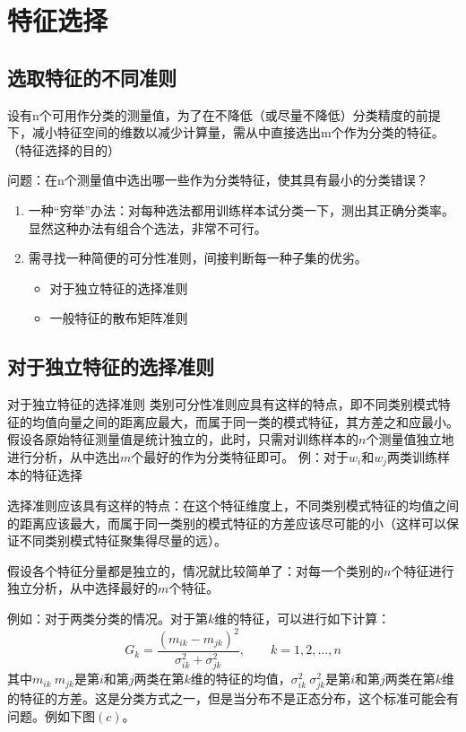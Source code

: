 \documentclass[12pt, letterpaper]{article}
\begin{document}
\section{特征选择}



\subsection{选取特征的不同准则}
设有n个可用作分类的测量值，为了在不降低（或尽量不降低）分类精度的前提下，减小特征空间的维数以减少计算量，需从中直接选出m个作为分类的特征。（特征选择的目的）

问题：在n个测量值中选出哪一些作为分类特征，使其具有最小的分类错误？
\begin{enumerate}
\item 一种“穷举”办法：对每种选法都用训练样本试分类一下，测出其正确分类率。显然这种办法有组合个选法，非常不可行。
\item 需寻找一种简便的可分性准则，间接判断每一种子集的优劣。
\begin{itemize}
\item 对于独立特征的选择准则
\item 一般特征的散布矩阵准则
\end{itemize}
\end{enumerate}



\subsection{对于独立特征的选择准则}
对于独立特征的选择准则
类别可分性准则应具有这样的特点，即不同类别模式特征的均值向量之间的距离应最大，而属于同一类的模式特征，其方差之和应最小。
假设各原始特征测量值是统计独立的，此时，只需对训练样本的$n$个测量值独立地进行分析，从中选出$m$个最好的作为分类特征即可。
例：对于$w_i$和$w_j$两类训练样本的特征选择

选择准则应该具有这样的特点：在这个特征维度上，不同类别模式特征的均值之间的距离应该最大，而属于同一类别的模式特征的方差应该尽可能的小（这样可以保证不同类别模式特征聚集得尽量的远）。

假设各个特征分量都是独立的，情况就比较简单了：对每一个类别的$n$个特征进行独立分析，从中选择最好的$m$个特征。

例如：对于两类分类的情况。对于第$k$维的特征，可以进行如下计算：
\begin{equation}
G_k=\frac{(m_{ik}-m_{jk})^2}{\sigma_{ik}^2+\sigma_{jk}^2},\qquad k=1,2,\ldots,n
\end{equation}
其中$m_{ik}\ m_{jk}$是第$i$和第$j$两类在第$k$维的特征的均值，$\sigma_{ik}^2\ \sigma_{jk}^2$是第$i$和第$j$两类在第$k$维的特征的方差。这是分类方式之一，但是当分布不是正态分布，这个标准可能会有问题。例如下图$(c)$。
\end{document}
